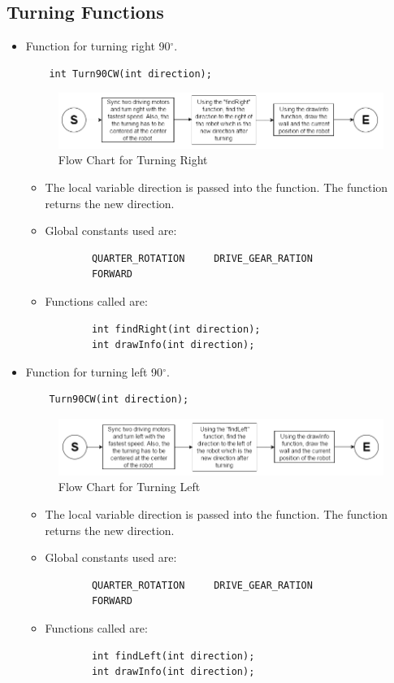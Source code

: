 \documentclass[11pt]{article}
\begin{document}

\subsection{Turning Functions}
\begin{itemize}
\item Function for turning right 90$^\circ$.
\begin{verbatim}
	int Turn90CW(int direction);
\end{verbatim}
\begin{figure}[htp]
\centering
\includegraphics[scale=0.6]{images/Software_Flowchart/Turning_Right.png}
\caption{Flow Chart for Turning Right}
\label{}
\end{figure}
	\begin{itemize}
	\item The local variable direction is passed into the function. The function returns the new direction.
	\item Global constants used are:
	\begin{verbatim}
		QUARTER_ROTATION     DRIVE_GEAR_RATION
		FORWARD
	\end{verbatim}
	\item Functions called are:
	\begin{verbatim}
		int findRight(int direction);
		int drawInfo(int direction);
	\end{verbatim}
	\end{itemize}
\item Function for turning left 90$^\circ$.
\begin{verbatim}
	Turn90CW(int direction);
\end{verbatim}
\begin{figure}[htp]
\centering
\includegraphics[scale=0.60]{images/Software_Flowchart/Turning_Left.png}
\caption{Flow Chart for Turning Left}
\label{}
\end{figure}
	\begin{itemize}
	\item The local variable direction is passed into the function. The function returns the new direction.
	\item Global constants used are:
	\begin{verbatim}
		QUARTER_ROTATION     DRIVE_GEAR_RATION
		FORWARD
	\end{verbatim}
	\item Functions called are:
	\begin{verbatim}
		int findLeft(int direction);
		int drawInfo(int direction);
	\end{verbatim}
	\end{itemize}
\end{itemize}
\newpage
\end{document}

